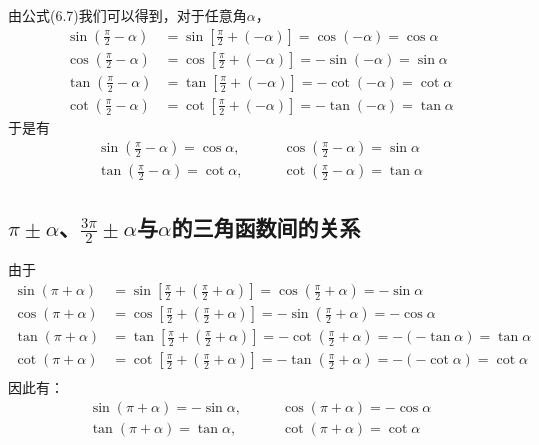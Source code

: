 由公式(6.7)我们可以得到，对于任意角$\alpha$，
\[\begin{split}
\sin\left(\frac{\pi}{2}-\alpha\right)&=\sin\left[\frac{\pi}{2}+(-\alpha)\right]=  \cos(-\alpha)=\cos\alpha \\
\cos\left(\frac{\pi}{2}-\alpha\right)&=\cos\left[\frac{\pi}{2}+(-\alpha)\right]=  -\sin(-\alpha)=\sin\alpha \\
\tan\left(\frac{\pi}{2}-\alpha\right)&=\tan\left[\frac{\pi}{2}+(-\alpha)\right]= -\cot(-\alpha)=\cot\alpha  \\
\cot\left(\frac{\pi}{2}-\alpha\right)&=\cot\left[\frac{\pi}{2}+(-\alpha)\right]=  -\tan(-\alpha)=\tan\alpha 
\end{split}\]
于是有
\begin{equation}
\begin{split}
    \sin\left(\frac{\pi}{2}-\alpha\right)=\cos\alpha, &\qquad \cos\left(\frac{\pi}{2}-\alpha\right)=\sin\alpha \\
    \tan\left(\frac{\pi}{2}-\alpha\right)=\cot\alpha, &\qquad \cot\left(\frac{\pi}{2}-\alpha\right)=\tan\alpha 
\end{split}    
\end{equation}

\subsection{$\pi\pm\alpha$、$\frac{3\pi}{2}\pm \alpha$与$\alpha$的三角函数间的关系}
由于
\[\begin{split}
\sin(\pi+\alpha)&=\sin \left[\frac{\pi}{2}+\left(\frac{\pi}{2}+\alpha\right)\right]=\cos\left(\frac{\pi}{2}+\alpha\right)=-\sin\alpha\\
\cos(\pi+\alpha)&=\cos \left[\frac{\pi}{2}+\left(\frac{\pi}{2}+\alpha\right)\right]=-\sin\left(\frac{\pi}{2}+\alpha\right)=-\cos\alpha\\
\tan(\pi+\alpha)&=\tan \left[\frac{\pi}{2}+\left(\frac{\pi}{2}+\alpha\right)\right]=-\cot\left(\frac{\pi}{2}+\alpha\right)=-(-\tan\alpha)=\tan\alpha\\
\cot(\pi+\alpha)&=\cot \left[\frac{\pi}{2}+\left(\frac{\pi}{2}+\alpha\right)\right]=-\tan\left(\frac{\pi}{2}+\alpha\right)=-(-\cot\alpha)=\cot\alpha\\
\end{split}\]
因此有：
\begin{equation}
    \begin{split}
        \sin\left(\pi+\alpha\right)=-\sin\alpha, &\qquad \cos\left(\pi+\alpha\right)=-\cos\alpha \\
        \tan\left(\pi+\alpha\right)=\tan\alpha, &\qquad \cot\left(\pi+\alpha\right)=\cot\alpha 
    \end{split}    
    \end{equation}


